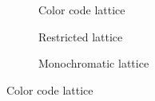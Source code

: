 \documentclass{article}
\begin{document}
\begin{figure}[ht]
    \centering
    \begin{subfigure}{0.31666666666666665\textwidth}
        \centering
        \resizebox{\textwidth}{!}{}
        \caption{Color code lattice}
    \end{subfigure}
    \hfill
    \begin{subfigure}{0.31666666666666665\textwidth}
        \centering
        \resizebox{\textwidth}{!}{}
        \caption{Restricted lattice}
    \end{subfigure}
    \hfill
    \begin{subfigure}{0.31666666666666665\textwidth}
        \centering
        \resizebox{\textwidth}{!}{}
        \caption{Monochromatic lattice}
    \end{subfigure}
    
    \vspace{0.5cm}
    \caption{Color code lattice}
\end{figure}
\end{document}
